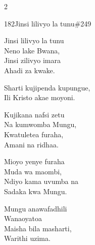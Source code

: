 \documentclass{article}
\begin{document}
\begin{multicols}{2}
\begin{hymn}{182}{Jinsi lilivyo la tunu}{\#249}
\begin{stanza}
Jinsi lilivyo la tunu\\
Neno lake Bwana,\\
Jinsi zilivyo imara\\
Ahadi za kwake.
\end{stanza}
\begin{chorus}
Sharti kujipenda kupungue,\\
Ili Kristo akae moyoni.
\end{chorus}
\begin{stanza}
Kujikana nafsi zetu\\
Na kumwomba Mungu,\\
Kwatuletea furaha,\\
Amani na ridhaa.
\end{stanza}
\begin{stanza}
Mioyo yenye furaha\\
Muda wa maombi,\\
Ndiyo kama uvumba na\\
Sadaka kwa Mungu.
\end{stanza}
\begin{stanza}
Mungu anawafadhili\\
Wanaoyatoa\\
Maisha bila masharti,\\
Warithi uzima.
\end{stanza}
\end{hymn}


\end{multicols}
\end{document}
